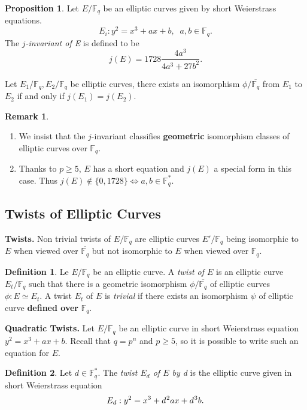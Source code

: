 \documentclass[10pt]{article}
\theoremstyle{definition}
\newtheorem{definition}{Definition}
\newtheorem{proposition}{Proposition}
\newtheorem{remark}{Remark}
\newcommand{\F}{\mathbb{F}}
\begin{document}
\begin{proposition}
Let $E/\F_q$ be an elliptic curves given by short Weierstrass equations.
\[ E_i : y^2 = x^3 + ax + b, \; \; a, b \in \F_q. \]
The \textsl{$j$-invariant of E} is defined to be 
\[j(E) = 1728 \frac{4a^3}{4a^3+27b^2}.\]

\noindent Let $E_1/\F_q, E_2/\F_q$ be elliptic curves, there exists an isomorphism $\phi / \overline{\F_q}$ from $E_1$ to $E_2$ if and only if $j(E_1) = j(E_2)$. 
\end{proposition}

\noindent \begin{remark}
\begin{enumerate}
\item We insist that the $j$-invariant classifies \textbf{geometric} isomorphism classes of elliptic curves over $\F_q$. 
\item Thanks to $p \geq 5$, $E$ has a short equation and $j(E)$ a special form in this case.
Thus $j(E) \notin \lbrace 0, 1728 \rbrace \Leftrightarrow a,b \in \F_q^{*}$.
\end{enumerate}
\end{remark}

\subsection{Twists of Elliptic Curves}

\noindent \textbf{Twists.} Non trivial twists of $E/\F_q$ are elliptic curves $E'/\F_q$ being isomorphic to $E$ when viewed over $\overline{\F_q}$ but not isomorphic to $E$ when viewed over $\F_q$.

\begin{definition}
Le $E/\F_q$ be an elliptic curve.
A \textsl{twist of $E$} is an elliptic curve $E_t/\F_q$ such that there is a geometric isomorphism $\phi/\overline{\F_q}$ of elliptic curves $\phi : E \simeq E_t$.
A twist $E_t$ of $E$ is \textsl{trivial} if there exists an isomorphism $\psi$ of elliptic curve \textbf{defined over} $\F_q$.
\end{definition}

\vspace*{.5cm}
\noindent \textbf{Quadratic Twists.} Let $E/\F_q$ be an elliptic curve in short Weierstrass equation $y^2 = x^3+ax+b$.
Recall that $q = p^n$ and $p \geq 5$, so it is possible to write such an equation for $E$. 

\begin{definition}
Let $d \in \F_q^*$.
The \textsl{twist $E_d$ of $E$ by d} is the elliptic curve given in short Weierstrass equation
\[ E_d : y^2 = x^3 + d^{\mkern1mu 2}ax + d^{\mkern1mu 3}b.\]
\end{definition}
\end{document}

